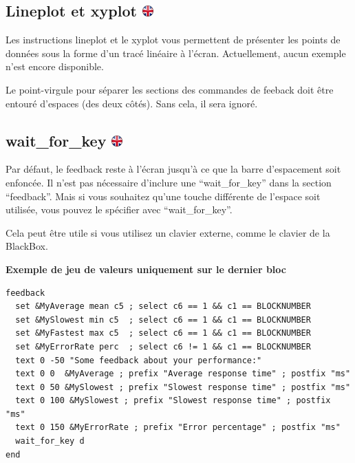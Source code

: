 \documentclass[
]{book}
\begin{document}
\hypertarget{lineplot-et-xyplot-ikflag}{%
\subsection[Lineplot et xyplot ]{\texorpdfstring{Lineplot et xyplot
\href{https://www.psytoolkit.org/doc3.1.0/feedback.html\#_lineplot_and_xyplot}{\protect\includegraphics{img/ukflag.png}}}{Lineplot et xyplot ikflag}}\label{lineplot-et-xyplot-ikflag}}

Les instructions lineplot et le xyplot vous permettent de présenter les
points de données sous la forme d'un tracé linéaire à l'écran.
Actuellement, aucun exemple n'est encore disponible.

Le point-virgule pour séparer les sections des commandes de feeback doit
être entouré d'espaces (des deux côtés). Sans cela, il sera ignoré.

\hypertarget{wait_for_key-ikflag}{%
\subsection[wait\_for\_key ]{\texorpdfstring{wait\_for\_key
\href{https://www.psytoolkit.org/doc3.1.0/feedback.html\#_wait-for_key}{\protect\includegraphics{img/ukflag.png}}}{wait\_for\_key ikflag}}\label{wait_for_key-ikflag}}

Par défaut, le feedback reste à l'écran jusqu'à ce que la barre
d'espacement soit enfoncée. Il n'est pas nécessaire d'inclure une
``wait\_for\_key'' dans la section ``feedback''. Mais si vous souhaitez
qu'une touche différente de l'espace soit utilisée, vous pouvez le
spécifier avec ``wait\_for\_key''.

Cela peut être utile si vous utilisez un clavier externe, comme le
clavier de la BlackBox.

\textbf{Exemple de jeu de valeurs uniquement sur le dernier bloc}

\begin{verbatim}
feedback
  set &MyAverage mean c5 ; select c6 == 1 && c1 == BLOCKNUMBER
  set &MySlowest min c5  ; select c6 == 1 && c1 == BLOCKNUMBER
  set &MyFastest max c5  ; select c6 == 1 && c1 == BLOCKNUMBER
  set &MyErrorRate perc  ; select c6 != 1 && c1 == BLOCKNUMBER
  text 0 -50 "Some feedback about your performance:"
  text 0 0  &MyAverage ; prefix "Average response time" ; postfix "ms"
  text 0 50 &MySlowest ; prefix "Slowest response time" ; postfix "ms"
  text 0 100 &MySlowest ; prefix "Slowest response time" ; postfix "ms"
  text 0 150 &MyErrorRate ; prefix "Error percentage" ; postfix "ms"
  wait_for_key d
end
\end{verbatim}
\end{document}
